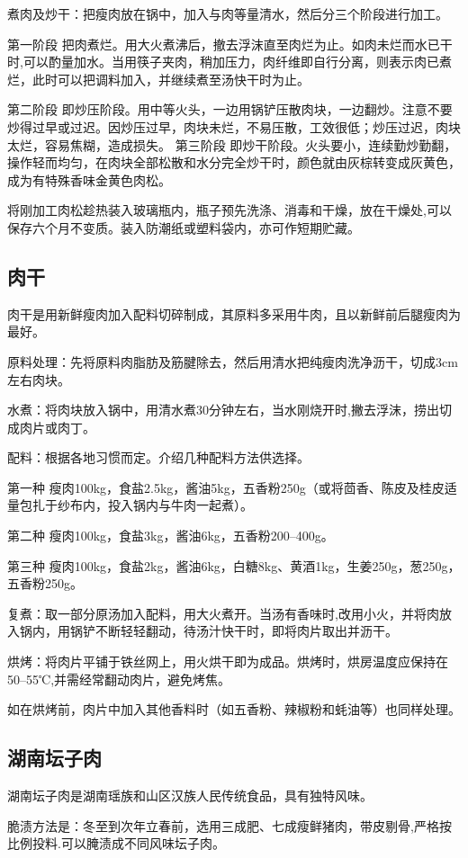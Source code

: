 \documentclass{ctexbook}
\begin{document}
煮肉及炒干：把瘦肉放在锅中，加入与肉等量清水，然后分三个阶段进行加工。

第一阶段 把肉煮烂。用大火煮沸后，撤去浮沫直至肉烂为止。如肉未烂而水已干时,可以酌量加水。当用筷子夹肉，稍加压力，肉纤维即自行分离，则表示肉已煮烂，此时可以把调料加入，并继续煮至汤快干时为止。

第二阶段 即炒压阶段。用中等火头，一边用锅铲压散肉块，一边翻炒。注意不要炒得过早或过迟。因炒压过早，肉块未烂，不易压散，工效很低；炒压过迟，肉块太烂，容易焦糊，造成损失。
第三阶段 即炒干阶段。火头要小，连续勤炒勤翻，操作轻而均匀，在肉块全部松散和水分完全炒干时，颜色就由灰棕转变成灰黄色，成为有特殊香味金黄色肉松。

将刚加工肉松趁热装入玻璃瓶内，瓶子预先洗涤、消毒和干燥，放在干燥处,可以保存六个月不变质。装入防潮纸或塑料袋内，亦可作短期贮藏。
\subsection{肉干}
肉干是用新鲜瘦肉加入配料切碎制成，其原料多采用牛肉，且以新鲜前后腿瘦肉为最好。

原料处理：先将原料肉脂肪及筋腱除去，然后用清水把纯瘦肉洗净沥干，切成3cm左右肉块。

水煮：将肉块放入锅中，用清水煮30分钟左右，当水刚烧开时,撇去浮沫，捞出切成肉片或肉丁。

配料：根据各地习惯而定。介绍几种配料方法供选择。

第一种 瘦肉100kg，食盐2.5kg，酱油5kg，五香粉250g（或将茴香、陈皮及桂皮适量包扎于纱布内，投入锅内与牛肉一起煮）。

第二种 瘦肉100kg，食盐3kg，酱油6kg，五香粉200--400g。

第三种 瘦肉100kg，食盐2kg，酱油6kg，白糖8kg、黄酒1kg，生姜250g，葱250g，五香粉250g。

复煮：取一部分原汤加入配料，用大火煮开。当汤有香味时,改用小火，并将肉放入锅内，用锅铲不断轻轻翻动，待汤汁快干时，即将肉片取出并沥干。

烘烤：将肉片平铺于铁丝网上，用火烘干即为成品。烘烤时，烘房温度应保持在50--55℃,并需经常翻动肉片，避免烤焦。

如在烘烤前，肉片中加入其他香料时（如五香粉、辣椒粉和蚝油等）也同样处理。
\subsection{湖南坛子肉}
湖南坛子肉是湖南瑶族和山区汉族人民传统食品，具有独特风味。

脆渍方法是：冬至到次年立春前，选用三成肥、七成瘦鲜猪肉，带皮剔骨,严格按比例投料.可以腌渍成不同风味坛子肉。
\end{document}

